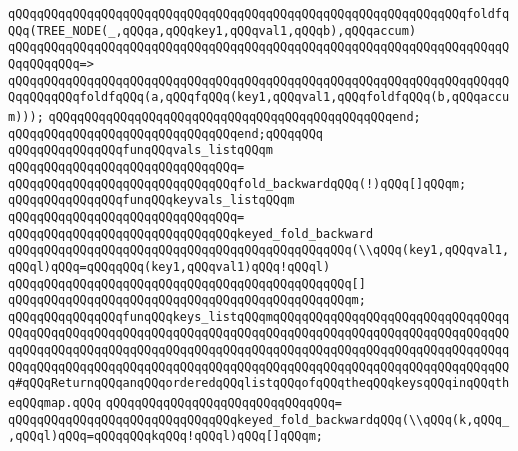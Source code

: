 \verb|qQQqqQQqqQQqqQQqqQQqqQQqqQQqqQQqqQQqqQQqqQQqqQQqqQQqqQQqqQQqqQQqfoldfqQQq(TREE_NODE(_,qQQqa,qQQqkey1,qQQqval1,qQQqb),qQQqaccum)|\newline
\verb|qQQqqQQqqQQqqQQqqQQqqQQqqQQqqQQqqQQqqQQqqQQqqQQqqQQqqQQqqQQqqQQqqQQqqQQqqQQqqQQq=>|\newline
\verb|qQQqqQQqqQQqqQQqqQQqqQQqqQQqqQQqqQQqqQQqqQQqqQQqqQQqqQQqqQQqqQQqqQQqqQQqqQQqqQQqfoldfqQQq(a,qQQqfqQQq(key1,qQQqval1,qQQqfoldfqQQq(b,qQQqaccum)));|\newline
\verb|qQQqqQQqqQQqqQQqqQQqqQQqqQQqqQQqqQQqqQQqqQQqqQQqend;|\newline
\verb|qQQqqQQqqQQqqQQqqQQqqQQqqQQqqQQqend;qQQqqQQq|\newline
\newline
\verb|qQQqqQQqqQQqqQQqfunqQQqvals_listqQQqm|\newline
\verb|qQQqqQQqqQQqqQQqqQQqqQQqqQQqqQQq=|\newline
\verb|qQQqqQQqqQQqqQQqqQQqqQQqqQQqqQQqfold_backwardqQQq(!)qQQq[]qQQqm;|\newline
\newline
\verb|qQQqqQQqqQQqqQQqfunqQQqkeyvals_listqQQqm|\newline
\verb|qQQqqQQqqQQqqQQqqQQqqQQqqQQqqQQq=|\newline
\verb|qQQqqQQqqQQqqQQqqQQqqQQqqQQqqQQqkeyed_fold_backward|\newline
\verb|qQQqqQQqqQQqqQQqqQQqqQQqqQQqqQQqqQQqqQQqqQQqqQQq(\\qQQq(key1,qQQqval1,qQQql)qQQq=qQQqqQQq(key1,qQQqval1)qQQq!qQQql)|\newline
\verb|qQQqqQQqqQQqqQQqqQQqqQQqqQQqqQQqqQQqqQQqqQQqqQQq[]|\newline
\verb|qQQqqQQqqQQqqQQqqQQqqQQqqQQqqQQqqQQqqQQqqQQqqQQqm;|\newline
\newline
\verb|qQQqqQQqqQQqqQQqfunqQQqkeys_listqQQqmqQQqqQQqqQQqqQQqqQQqqQQqqQQqqQQqqQQqqQQqqQQqqQQqqQQqqQQqqQQqqQQqqQQqqQQqqQQqqQQqqQQqqQQqqQQqqQQqqQQqqQQqqQQqqQQqqQQqqQQqqQQqqQQqqQQqqQQqqQQqqQQqqQQqqQQqqQQqqQQqqQQqqQQqqQQqqQQqqQQqqQQqqQQqqQQqqQQqqQQqqQQqqQQqqQQqqQQqqQQqqQQqqQQqqQQqqQQqqQQqqQQq#qQQqReturnqQQqanqQQqorderedqQQqlistqQQqofqQQqtheqQQqkeysqQQqinqQQqtheqQQqmap.qQQq|\newline
\verb|qQQqqQQqqQQqqQQqqQQqqQQqqQQqqQQq=|\newline
\verb|qQQqqQQqqQQqqQQqqQQqqQQqqQQqqQQqkeyed_fold_backwardqQQq(\\qQQq(k,qQQq_,qQQql)qQQq=qQQqqQQqkqQQq!qQQql)qQQq[]qQQqm;|\newline
